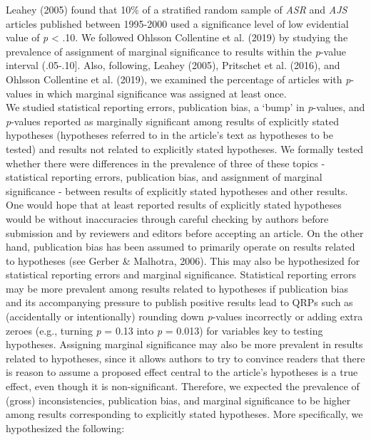\documentclass[
  12pt,
]{article}
\begin{document}
Leahey (2005) found that 10\% of a stratified random sample of
\emph{ASR} and \emph{AJS} articles published between 1995-2000 used a
significance level of low evidential value of \emph{p} \textless{} .10.
We followed Ohlsson Collentine et al. (2019) by studying the prevalence
of assignment of marginal significance to results within the
\emph{p}-value interval (.05-.10{]}. Also, following, Leahey (2005),
Pritschet et al. (2016), and Ohlsson Collentine et al. (2019), we
examined the percentage of articles with \emph{p}-values in which
marginal significance was assigned at least once.\\
\hspace*{0.333em}\hspace*{0.333em}\hspace*{0.333em}\hspace*{0.333em}We
studied statistical reporting errors, publication bias, a `bump' in
\emph{p}-values, and \emph{p}-values reported as marginally significant
among results of explicitly stated hypotheses (hypotheses referred to in
the article's text as hypotheses to be tested) and results not related
to explicitly stated hypotheses. We formally tested whether there were
differences in the prevalence of three of these topics - statistical
reporting errors, publication bias, and assignment of marginal
significance - between results of explicitly stated hypotheses and other
results. One would hope that at least reported results of explicitly
stated hypotheses would be without inaccuracies through careful checking
by authors before submission and by reviewers and editors before
accepting an article. On the other hand, publication bias has been
assumed to primarily operate on results related to hypotheses (see
Gerber \& Malhotra, 2006). This may also be hypothesized for statistical
reporting errors and marginal significance. Statistical reporting errors
may be more prevalent among results related to hypotheses if publication
bias and its accompanying pressure to publish positive results lead to
QRPs such as (accidentally or intentionally) rounding down
\emph{p}-values incorrectly or adding extra zeroes (e.g., turning
\emph{p} = 0.13 into \emph{p} = 0.013) for variables key to testing
hypotheses. Assigning marginal significance may also be more prevalent
in results related to hypotheses, since it allows authors to try to
convince readers that there is reason to assume a proposed effect
central to the article's hypotheses is a true effect, even though it is
non-significant. Therefore, we expected the prevalence of (gross)
inconsistencies, publication bias, and marginal significance to be
higher among results corresponding to explicitly stated hypotheses. More
specifically, we hypothesized the following:\\
\end{document}
